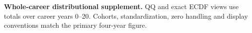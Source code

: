 \textbf{Whole-career distributional supplement.} QQ and exact ECDF views use totals over career years 0--20. Cohorts, standardization, zero handling and display conventions match the primary four-year figure.
